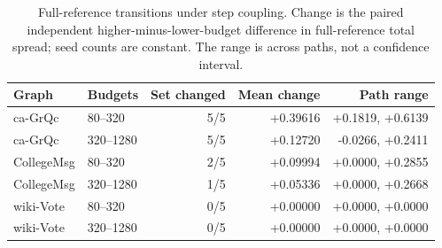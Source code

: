 \begin{table}[htbp]
\caption{Full-reference transitions under step coupling. Change is the paired independent higher-minus-lower-budget difference in full-reference total spread; seed counts are constant. The range is across paths, not a confidence interval.}\label{tab:transitions}
\begin{tabular}{llrrr}
\toprule
Graph & Budgets & Set changed & Mean change & Path range \\
\midrule
ca-GrQc & 80--320 & 5/5 & +0.39616 & +0.1819, +0.6139 \\
ca-GrQc & 320--1280 & 5/5 & +0.12720 & -0.0266, +0.2411 \\
CollegeMsg & 80--320 & 2/5 & +0.09994 & +0.0000, +0.2855 \\
CollegeMsg & 320--1280 & 1/5 & +0.05336 & +0.0000, +0.2668 \\
wiki-Vote & 80--320 & 0/5 & +0.00000 & +0.0000, +0.0000 \\
wiki-Vote & 320--1280 & 0/5 & +0.00000 & +0.0000, +0.0000 \\
\bottomrule
\end{tabular}
\end{table}
